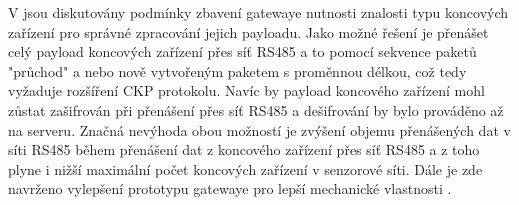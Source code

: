 %
V \DIFdelbegin {}%
\DIFdelend \DIFaddbegin {}\DIFaddend jsou diskutovány podmínky zbavení gatewaye nutnosti znalosti typu koncových zařízení pro správné zpracování jejich payloadu. 
Jako možné řešení je přenášet celý payload koncových zařízení přes síť RS485 a to pomocí sekvence paketů "průchod" a nebo nově vytvořeným paketem s proměnnou délkou, což tedy vyžaduje rozšíření CKP protokolu. Navíc by payload koncového zařízení mohl zůstat zašifrován při přenášení přes síť RS485 a dešifrování by bylo prováděno až na serveru.
Značná nevýhoda obou možností je zvýšení objemu přenášených dat v síti RS485 během přenášení dat z koncového zařízení přes síť RS485 a z toho plyne i nižší maximální počet koncových zařízení v senzorové síti.
Dále je zde navrženo vylepšení prototypu gatewaye \DIFaddbegin {}\DIFaddend pro lepší mechanické vlastnosti \DIFaddbegin {}\DIFaddend .












